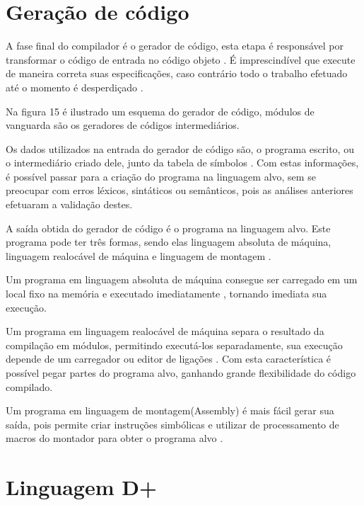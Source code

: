 \documentclass[12pt,oneside,a4paper,chapter=TITLE,section=TITLE,sumario=tradicional]{abntex2}
\begin{document}
\section{Geração de código}
\label{sec:geracao-de-codigo}

A fase final do compilador é o gerador de código, esta etapa é responsável por transformar o código de entrada no código objeto \cite{alfred1995}. É imprescindível que execute de maneira correta suas especificações, caso contrário todo o trabalho efetuado até o momento é desperdiçado \cite{alfred1995}.

Na figura 15 é ilustrado um esquema do gerador de código, módulos de vanguarda são os geradores de códigos intermediários.

\begin{figure}[htb]
\end{figure}

Os dados utilizados na entrada do gerador de código são, o programa escrito, ou o intermediário criado dele, junto da tabela de símbolos \cite{alfred1995}. Com estas informações, é possível passar para a criação do programa na linguagem alvo, sem se preocupar com erros léxicos, sintáticos ou semânticos, pois as análises anteriores efetuaram a validação destes.

A saída obtida do gerador de código é o programa na linguagem alvo. Este programa pode ter três formas, sendo elas linguagem absoluta de máquina, linguagem realocável de máquina e linguagem de montagem \cite{alfred1995}.

Um programa em linguagem absoluta de máquina consegue ser carregado em um local fixo na memória e executado imediatamente \cite{alfred1995}, tornando imediata sua execução.

Um programa em linguagem realocável de máquina separa o resultado da compilação em módulos, permitindo executá-los separadamente, sua execução depende de um carregador ou editor de ligações \cite{alfred1995}. Com esta característica é possível pegar partes do programa alvo, ganhando grande flexibilidade do código compilado.

Um programa em linguagem de montagem(Assembly) é mais fácil gerar sua saída, pois permite criar instruções simbólicas e utilizar de processamento de macros do montador para obter o programa alvo \cite{alfred1995}.

\section{Linguagem D+}
\label{sec:linguagem-d+}
\end{document}
